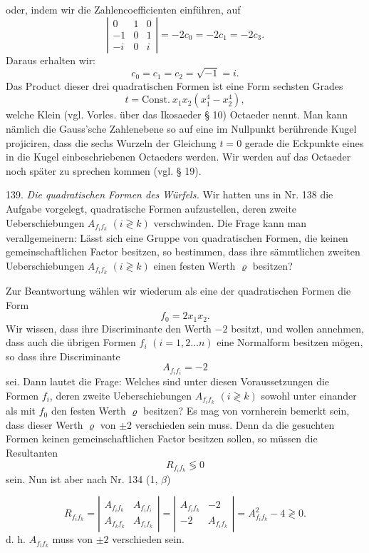 \documentclass[11pt]{article}
\providecommand{\weberpage}[1]{}
\begin{document}
\weberpage{158}
oder, indem wir die Zahlencoefficienten einführen, auf
\[
\left|\begin{array}{ccc} 0 & 1 & 0 \\ -1 & 0 & 1 \\ -i & 0 & i \end{array}\right| = -2c_0 = -2c_1 = -2c_3. %
\]
Daraus erhalten wir:
\[
c_0 = c_1 = c_2 = \sqrt{-1} = i.
\]
Das Product dieser drei quadratischen Formen ist eine Form sechsten
Grades
\[
t = \mathrm{Const.}\ x_1x_2(x_1^4 - x_2^4),
\]
welche Klein (vgl. Vorles. über das Ikosaeder § 10) Octaeder nennt.
Man kann nämlich die Gauss'sche Zahlenebene so auf eine im Nullpunkt
berührende Kugel projiciren, dass die sechs Wurzeln der Gleichung
$t = 0$ gerade die Eckpunkte eines in die Kugel einbeschriebenen
Octaeders werden. Wir werden auf das Octaeder noch später zu
sprechen kommen (vgl. § 19).

139. \textit{Die quadratischen Formen des Würfels.} Wir hatten uns in
Nr. 138 die Aufgabe vorgelegt, quadratische Formen aufzustellen,
deren zweite Ueberschiebungen $A_{f_if_k}$ $(i \gtrless k)$ verschwinden. Die Frage
kann man verallgemeinern: Lässt sich eine Gruppe von quadratischen
Formen, die keinen gemeinschaftlichen Factor besitzen, so bestimmen,
dass ihre sämmtlichen zweiten Ueberschiebungen $A_{f_if_k}$ $(i \gtrless k)$ einen
festen Werth $\varrho$ besitzen?

Zur Beantwortung wählen wir wiederum als eine der quadratischen
 Formen die Form
\[
f_0 = 2x_1x_2.
\]
Wir wissen, dass ihre Discriminante den Werth $-2$ besitzt, und wollen
annehmen, dass auch die übrigen Formen $f_i$ $(i = 1, 2 \dots n)$ eine
Normalform besitzen mögen, so dass ihre Discriminante
\[
A_{f_if_i} = -2
\]
sei. Dann lautet die Frage: Welches sind unter diesen Voraussetzungen
 die Formen $f_i$, deren zweite Ueberschiebungen $A_{f_if_k}$ $(i \gtrless k)$
sowohl unter einander als mit $f_0$ den festen Werth $\varrho$ besitzen? Es
mag von vornherein bemerkt sein, dass dieser Werth $\varrho$ von $\pm 2$ verschieden
 sein muss. Denn da die gesuchten Formen keinen gemeinschaftlichen
 Factor besitzen sollen, so müssen die Resultanten
\[
R_{f_if_k} \lessgtr 0
\]
sein. Nun ist aber nach Nr. 134 (1, $\beta$)


\weberpage{159}
\[
R_{f_if_k} = \left|\begin{array}{cc} A_{f_if_k} & A_{f_if_i} \\ A_{f_kf_k} & A_{f_if_k} \end{array}\right| = \left|\begin{array}{cc} A_{f_if_k} & -2 \\ -2 & A_{f_if_k} \end{array}\right| = A_{f_if_k}^2 - 4 \gtrless 0.
\]
d. h. $A_{f_if_k}$ muss von $\pm 2$ verschieden sein.
\end{document}
